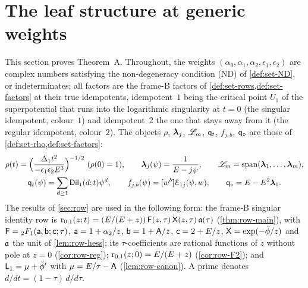 \providecommand{\leaVn}{\mathbf{n}}                       %
\providecommand{\leaPr}{\mathrm{Pr}}                      %
\providecommand{\leaPhiF}{\boldsymbol{\Phi}_{\Fhyp}}       %
\providecommand{\leaLt}{\Lnorm_{2}}                        %
\providecommand{\leaDt}{\mathsf{D}_{\stil}}                %
\providecommand{\leaDtau}{\mathsf{D}_{\stil,\tau}}         %
\providecommand{\leaNtw}{\mathsf{N}_{12}}                  %
\providecommand{\leaDisc}{\Ddisc_{1}}                      %
\providecommand{\TFsup}{\mathrm{F}}                        %

\section{The leaf structure at generic weights}
\label{sec:lea}

This section proves Theorem~A. Throughout, the weights $(\alpha_0,\alpha_1,\alpha_2,\epsilon_1,\epsilon_2)$ are complex numbers satisfying the non-degeneracy condition (ND) of \cref{def:set-ND}, or indeterminates; all factors are the frame-B factors of \cref{def:set-rows,def:set-factors} at their true idempotents, idempotent~$1$ being the critical point $U_1$ of the superpotential that runs into the logarithmic singularity at $t=0$ (the singular idempotent, colour~$1$) and idempotent~$2$ the one that stays away from it (the regular idempotent, colour~$2$). The objects $\rho$, $\boldsymbol{\lambda}_j$, $\mathscr{L}_m$, $\mathsf{q}_{t}$, $f_{j,b}$, $\mathsf{q}_{\circ}$ are those of \cref{def:set-rho,def:set-factors}:
\begin{gather*}
\rho(t) = \Bigl(\frac{\Delta_1 t^2}{-\epsilon_1\epsilon_2E^3}\Bigr)^{-1/2}\ (\rho(0)=1),\qquad
\boldsymbol{\lambda}_j(\psi) = \frac{1}{E-j\psi},\qquad \mathscr{L}_m = \operatorname{span}(\boldsymbol{\lambda}_1,\dots,\boldsymbol{\lambda}_m),\\
\mathsf{q}_{t}(\psi) = \sum_{d\geq 1}\mathsf{Dil}_1(d;t)\psi^d,\qquad f_{j,b}(\psi) = [w^b]\mathcal{E}_{1j}(\psi,w),\qquad \mathsf{q}_{\circ} = E - E^2\boldsymbol{\lambda}_1 .
\end{gather*}
The results of \cref{sec:row} are used in the following form: the frame-B singular identity row is $\mathrm{r}_{0,1}(z;t) = (E/(E+z))\,\mathsf{F}(z,\tau)\,\mathsf{X}(z,\tau)\,\mathfrak{a}(\tau)$ (\cref{thm:row-main}), with $\mathsf{F} = {}_2F_1(\mathsf{a},\mathsf{b};\mathsf{c};\tau)$, $\mathsf{a} = 1+\alpha_2/z$, $\mathsf{b} = 1+\mathsf{A}/z$, $\mathsf{c} = 2+E/z$, $\mathsf{X} = \exp(-\breve{\phi}/z)$ and $\mathfrak{a}$ the unit of \cref{lem:row-hess}; its $\tau$-coefficients are rational functions of $z$ without pole at $z=0$ (\cref{cor:row-reg}); $\mathrm{r}_{0,1}(z;0) = E/(E+z)$ (\cref{cor:row-F2}); and $\mathsf{L}_1 = \mu + \breve{\phi}'$ with $\mu = E/\tau - \mathsf{A}$ (\cref{lem:row-canon}). A prime denotes $d/dt = (1-\tau)\,d/d\tau$.

